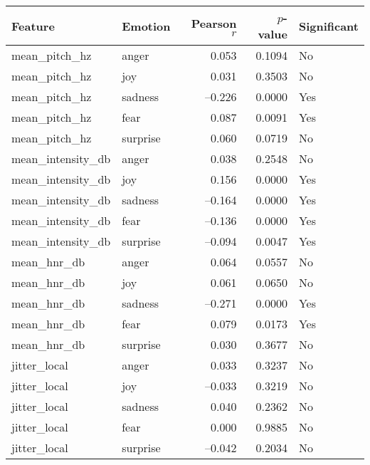 \begin{table}[ht]
    \centering

    \begin{tabular}{l l r r l}
      \toprule
      Feature               & Emotion  & Pearson $r$ & $p$-value & Significant \\
      \midrule
      mean\_pitch\_hz       & anger    &  0.053      & 0.1094    & No  \\
      mean\_pitch\_hz       & joy      &  0.031      & 0.3503    & No  \\
      mean\_pitch\_hz       & sadness  & –0.226      & 0.0000    & Yes \\
      mean\_pitch\_hz       & fear     &  0.087      & 0.0091    & Yes \\
      mean\_pitch\_hz       & surprise &  0.060      & 0.0719    & No  \\
      \addlinespace
      mean\_intensity\_db   & anger    &  0.038      & 0.2548    & No  \\
      mean\_intensity\_db   & joy      &  0.156      & 0.0000    & Yes \\
      mean\_intensity\_db   & sadness  & –0.164      & 0.0000    & Yes \\
      mean\_intensity\_db   & fear     & –0.136      & 0.0000    & Yes \\
      mean\_intensity\_db   & surprise & –0.094      & 0.0047    & Yes \\
      \addlinespace
      mean\_hnr\_db         & anger    &  0.064      & 0.0557    & No  \\
      mean\_hnr\_db         & joy      &  0.061      & 0.0650    & No  \\
      mean\_hnr\_db         & sadness  & –0.271      & 0.0000    & Yes \\
      mean\_hnr\_db         & fear     &  0.079      & 0.0173    & Yes \\
      mean\_hnr\_db         & surprise &  0.030      & 0.3677    & No  \\
      \addlinespace
      jitter\_local         & anger    &  0.033      & 0.3237    & No  \\
      jitter\_local         & joy      & –0.033      & 0.3219    & No  \\
      jitter\_local         & sadness  &  0.040      & 0.2362    & No  \\
      jitter\_local         & fear     &  0.000      & 0.9885    & No  \\
      jitter\_local         & surprise & –0.042      & 0.2034    & No  \\

\end{tabular}
\end{table}
